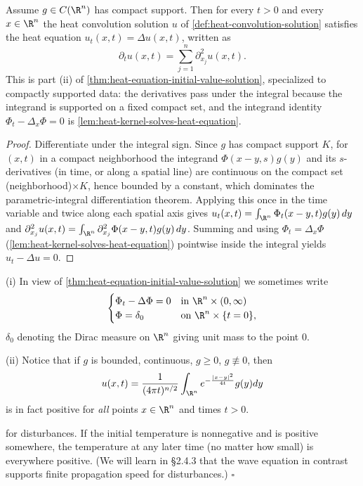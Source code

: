 \begin{lemma}
\label{lem:heat-convolution-solves-heat}
\leanok
Assume $g \in C(\R^n)$ has compact support. Then for every $t > 0$ and every
$x \in \R^n$ the heat convolution solution $u$ of \cref{def:heat-convolution-solution}
satisfies the heat equation $u_t(x,t) = \Delta u(x,t)$, written as
$$\partial_t u(x,t) = \sum_{j=1}^{n} \partial_{x_j}^2 u(x,t).$$
This is part (ii) of \cref{thm:heat-equation-initial-value-solution}, specialized to
compactly supported data: the derivatives pass under the integral because the
integrand is supported on a fixed compact set, and the integrand identity
$\Phi_t - \Delta_x\Phi = 0$ is \cref{lem:heat-kernel-solves-heat-equation}.
\end{lemma}
\begin{proof}
\leanok
Differentiate under the integral sign. Since $g$ has compact support $K$, for
$(x,t)$ in a compact neighborhood the integrand $\Phi(x-y,s)g(y)$ and its
$s$-derivatives (in time, or along a spatial line) are continuous on the compact set
(neighborhood)$\times K$, hence bounded by a constant, which dominates the
parametric-integral differentiation theorem. Applying this once in the time variable
and twice along each spatial axis gives $u_t(x,t) = \int_{\R^n}\Phi_t(x-y,t)g(y)\,dy$
and $\partial_{x_j}^2 u(x,t) = \int_{\R^n}\partial_{x_j}^2\Phi(x-y,t)g(y)\,dy$. Summing
and using $\Phi_t = \Delta_x\Phi$ (\cref{lem:heat-kernel-solves-heat-equation})
pointwise inside the integral yields $u_t - \Delta u = 0$.
\end{proof}

\begin{remark}
\label{rem:heat-equation-infinite-propagation-speed}
(i) In view of \cref{thm:heat-equation-initial-value-solution} we sometimes write
$$\begin{cases} \Phi_t - \Delta\Phi = 0 & \text{in } \R^n \times (0,\infty) \\ \Phi = \delta_0 & \text{on } \R^n \times \{t = 0\}, \end{cases}$$
$\delta_0$ denoting the Dirac measure on $\R^n$ giving unit mass to the point $0$.

(ii) Notice that if $g$ is bounded, continuous, $g \geq 0$, $g \not\equiv 0$, then
$$u(x,t) = \frac{1}{(4\pi t)^{n/2}} \int_{\R^n} e^{-\frac{|x-y|^2}{4t}} g(y) dy$$
is in fact positive for \textit{all} points $x \in \R^n$ and times $t > 0$.

for disturbances. If the initial temperature is nonnegative and is positive somewhere, the temperature at any later time (no matter how small) is everywhere positive. (We will learn in \S2.4.3 that the wave equation in contrast supports finite propagation speed for disturbances.) $\square$
\end{remark}

